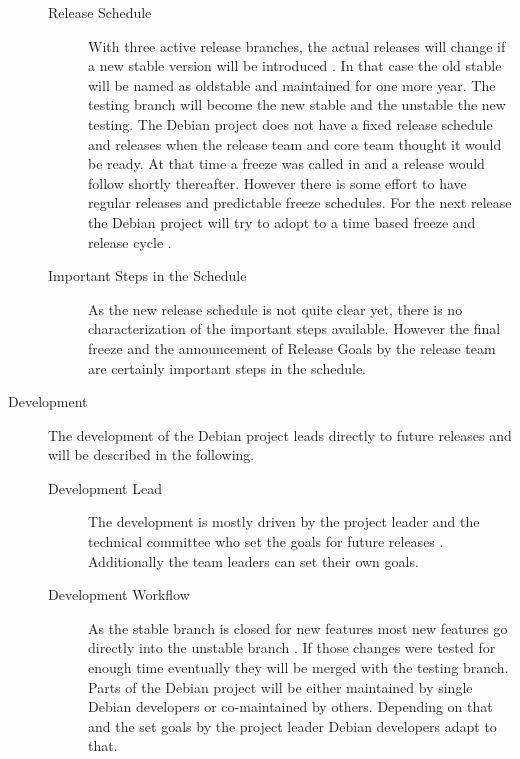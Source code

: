 \begin{description}
\begin{description}
    \item[Release Schedule] With three active release branches, the actual
      releases will change if a new stable version will be introduced
      \cite{McGovern2011,DebianReleaseManagement,DebianReleaseGoals}. In that
      case the old stable will be named as oldstable and maintained for one
      more year. The testing branch will become the new stable and the unstable
      the new testing. The Debian project does not have a fixed release
      schedule and releases when the release team and core team thought it
      would be ready. At that time a freeze was called in and a release would
      follow shortly thereafter. However there is some effort to have regular
      releases and predictable freeze schedules. For the next release the
      Debian project will try to adopt to a time based freeze and release cycle
      \cite{McGovern2011}.

    \item[Important Steps in the Schedule] As the new release schedule is not
      quite clear yet, there is no characterization of the important steps
      available. However the final freeze and the announcement of Release Goals
      by the release team are certainly important steps in the schedule.

  \end{description}

  \item[Development] The development of the Debian project leads directly to
    future releases and will be described in the following.

  \begin{description}

    \item[Development Lead] The development is mostly driven by the project
      leader and the technical committee who set the goals for future releases
      \cite{DebianOrg}. Additionally the team leaders can set their own goals.

    \item[Development Workflow] As the stable branch is closed for new features
      most new features go directly into the unstable branch
      \cite{DebianFAQ,DebianDev,DebianReleaseManagement}. If those changes were
      tested for enough time eventually they will be merged with the testing
      branch. Parts of the Debian project will be either maintained by single
      Debian developers or co-maintained by others. Depending on that and the
      set goals by the project leader Debian developers adapt to that.


\end{description}
\end{description}
